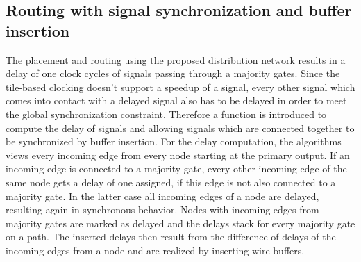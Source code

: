 \subsection{Routing with signal synchronization and buffer insertion}
The placement and routing using the proposed distribution network results in a delay of one clock cycles of signals passing through a majority gates. Since the tile-based clocking doesn't support a speedup of a signal, every other signal which comes into contact with a delayed signal also has to be delayed in order to meet the global synchronization constraint. Therefore a function is introduced to compute the delay of signals and allowing signals which are connected together to be synchronized by buffer insertion. For the delay computation, the algorithms views every incoming edge from every node starting at the primary output. If an incoming edge is connected to a majority gate, every other incoming edge of the same node gets a delay of one assigned, if this edge is not also connected to a majority gate. In the latter case all incoming edges of a node are delayed, resulting again in synchronous behavior. Nodes with incoming edges from majority gates are marked as delayed and the delays stack for every majority gate on a path. The inserted delays then result from the difference of delays of the incoming edges from a node and are realized by inserting wire buffers. 

